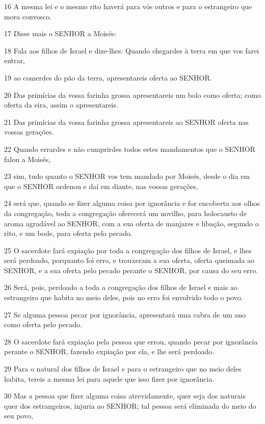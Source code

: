 \par 16 A mesma lei e o mesmo rito haverá para vós outros e para o estrangeiro que mora convosco.
\par 17 Disse mais o SENHOR a Moisés:
\par 18 Fala aos filhos de Israel e dize-lhes: Quando chegardes à terra em que vos farei entrar,
\par 19 ao comerdes do pão da terra, apresentareis oferta ao SENHOR.
\par 20 Das primícias da vossa farinha grossa apresentareis um bolo como oferta; como oferta da eira, assim o apresentareis.
\par 21 Das primícias da vossa farinha grossa apresentareis ao SENHOR oferta nas vossas gerações.
\par 22 Quando errardes e não cumprirdes todos estes mandamentos que o SENHOR falou a Moisés,
\par 23 sim, tudo quanto o SENHOR vos tem mandado por Moisés, desde o dia em que o SENHOR ordenou e daí em diante, nas vossas gerações,
\par 24 será que, quando se fizer alguma coisa por ignorância e for encoberta aos olhos da congregação, toda a congregação oferecerá um novilho, para holocausto de aroma agradável ao SENHOR, com a sua oferta de manjares e libação, segundo o rito, e um bode, para oferta pelo pecado.
\par 25 O sacerdote fará expiação por toda a congregação dos filhos de Israel, e lhes será perdoado, porquanto foi erro, e trouxeram a sua oferta, oferta queimada ao SENHOR, e a sua oferta pelo pecado perante o SENHOR, por causa do seu erro.
\par 26 Será, pois, perdoado a toda a congregação dos filhos de Israel e mais ao estrangeiro que habita no meio deles, pois no erro foi envolvido todo o povo.
\par 27 Se alguma pessoa pecar por ignorância, apresentará uma cabra de um ano como oferta pelo pecado.
\par 28 O sacerdote fará expiação pela pessoa que errou, quando pecar por ignorância perante o SENHOR, fazendo expiação por ela, e lhe será perdoado.
\par 29 Para o natural dos filhos de Israel e para o estrangeiro que no meio deles habita, tereis a mesma lei para aquele que isso fizer por ignorância.
\par 30 Mas a pessoa que fizer alguma coisa atrevidamente, quer seja dos naturais quer dos estrangeiros, injuria ao SENHOR; tal pessoa será eliminada do meio do seu povo,
